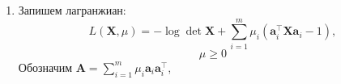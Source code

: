 \documentclass{article}
\begin{document}
\begin{enumerate}
	      Запишем лагранжиан:

	      \[
		      L(\mathbf{x}, y, \mu) = y +
		      \sum_{i=1}^k \mu_i (\mathbf{a}_i^\top
		      \mathbf{x} + b_i - \mathbf{y}),
	      \]
	      \[
		      \mu \geq 0
	      \]

	      Запишем двойственную задачу:

	      \begin{align*}
		      g(\mu) & = \inf_{\mathbf{x}, y}
		      L(\mathbf{x}, y, \mu)                              \\
		             & = \sum_{i=1}^k \mu_i b_i +
		      \inf_{x, y} \left( y + \sum_{i=1}^k \mu_i
		      (\mathbf{a}_i^\top \mathbf{x} - y) \right)         \\
		             & = \sum_{i=1}^k \mu_i b_i +
		      \inf_{x, y} \left(
		      y \left( 1 - \sum_{i=1}^k \mu_i \right) +
		      \mathbf{x} \sum_{i=1}^k \mu_i \mathbf{a}_i \right) \\
		             & = \mu^\top \mathbf{b} +
		      \begin{cases}
			      0       & \text{if } \sum_{i=1}^k \mu_i = 1, \
			      \sum_{i=1}^k \mu_i \mathbf{a}_i                \\
			      -\infty & \text{otherwise}
		      \end{cases}
	      \end{align*}

	      Тогда двойственная задача будет:

	      \begin{equation*}
		      \begin{aligned}
			       & \text{Maximize}   &  & \mu^\top \mathbf{b}                    \\
			       & \text{Subject to} &  & \sum_{i=1}^k \mu_i = 1                 \\
			       &                   &  & \sum_{i=1}^k \mu_i \mathbf{a}_i \geq 0 \\
			       &                   &  & \mu \geq 0
		      \end{aligned}
	      \end{equation*}

	\item Запишем лагранжиан:
	      \[
		      L(\mathbf{X}, \mu) = -\log\det
		      \mathbf{X} + \sum_{i=1}^{m} \mu_i
		      (\mathbf{a}_i^\top \mathbf{Xa}_i - 1),
	      \]
	      \[
		      \mu \geq 0
	      \]
	      Обозначим $\mathbf{A} = \sum_{i=1}^{m}
		      \mu_i \mathbf{a}_i \mathbf{a}_i^\top$,


\end{enumerate}
\end{document}
